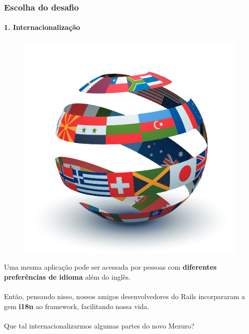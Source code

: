 \documentclass{beamer}
\begin{document}
\begin{frame}
  \frametitle{Escolha do desafio}
  \framesubtitle{1. Internacionalização}
  \begin{figure}[htb]
    \begin{center}
      \includegraphics[scale=0.18]{small-globe.png}
    \end{center}
  \end{figure}

  Uma mesma aplicação pode ser acessada por pessoas com \textbf{diferentes preferências de idioma} além do inglês. \\~\\

  Então, pensando nisso, nossos amigos desenvolvedores do Rails incorpararam a gem \textbf{i18n} ao framework, facilitando nossa vida. \\~\\

  Que tal internacionalizarmos algumas partes do novo Mezuro?
\end{frame}
\end{document}

